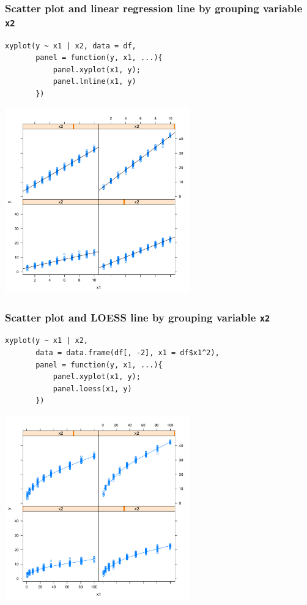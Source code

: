 \documentclass[bigger]{beamer}
\begin{document}
\begin{frame}[fragile,shrink = 10]
\frametitle{Scatter plot and linear regression line by grouping variable \texttt{x2}}
\label{sec-2_9}

\lstset{language=R}
\begin{lstlisting}
xyplot(y ~ x1 | x2, data = df, 
       panel = function(y, x1, ...){
           panel.xyplot(x1, y);
           panel.lmline(x1, y)
       })
\end{lstlisting}



\includegraphics[width=0.6\textwidth]{../graphs/lattice_scatter_reg.pdf}
\end{frame}
\begin{frame}[fragile,shrink = 10]
\frametitle{Scatter plot and LOESS line by grouping variable \texttt{x2}}
\label{sec-2_10}

\lstset{language=R}
\begin{lstlisting}
xyplot(y ~ x1 | x2, 
       data = data.frame(df[, -2], x1 = df$x1^2), 
       panel = function(y, x1, ...){
           panel.xyplot(x1, y);
           panel.loess(x1, y)
       })
\end{lstlisting}



\includegraphics[width=0.6\textwidth]{../graphs/lattice_scatter_loess.pdf}
\end{frame}
\end{document}
